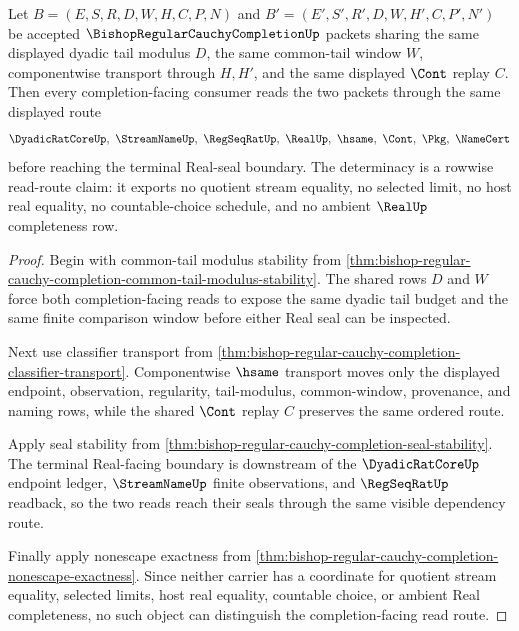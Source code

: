 \begin{theorem}
\label{thm:bishop-regular-cauchy-completion-tail-determinacy}
Let $B=(E,S,R,D,W,H,C,P,N)$ and $B'=(E',S',R',D,W,H',C,P',N')$ be accepted $\BishopRegularCauchyCompletionUp$ packets sharing the same displayed dyadic tail modulus $D$, the same common-tail window $W$, componentwise transport through $H,H'$, and the same displayed $\Cont$ replay $C$. Then every completion-facing consumer reads the two packets through the same displayed route
$$
\DyadicRatCoreUp,\ \StreamNameUp,\ \RegSeqRatUp,\ \RealUp,\ \hsame,\ \Cont,\ \Pkg,\ \NameCert
$$
before reaching the terminal Real-seal boundary. The determinacy is a rowwise read-route claim: it exports no quotient stream equality, no selected limit, no host real equality, no countable-choice schedule, and no ambient $\RealUp$ completeness row.
\end{theorem}
\begin{proof}
Begin with common-tail modulus stability from \autoref{thm:bishop-regular-cauchy-completion-common-tail-modulus-stability}. The shared rows $D$ and $W$ force both completion-facing reads to expose the same dyadic tail budget and the same finite comparison window before either Real seal can be inspected.

Next use classifier transport from \autoref{thm:bishop-regular-cauchy-completion-classifier-transport}. Componentwise $\hsame$ transport moves only the displayed endpoint, observation, regularity, tail-modulus, common-window, provenance, and naming rows, while the shared $\Cont$ replay $C$ preserves the same ordered route.

Apply seal stability from \autoref{thm:bishop-regular-cauchy-completion-seal-stability}. The terminal Real-facing boundary is downstream of the $\DyadicRatCoreUp$ endpoint ledger, $\StreamNameUp$ finite observations, and $\RegSeqRatUp$ readback, so the two reads reach their seals through the same visible dependency route.

Finally apply nonescape exactness from \autoref{thm:bishop-regular-cauchy-completion-nonescape-exactness}. Since neither carrier has a coordinate for quotient stream equality, selected limits, host real equality, countable choice, or ambient Real completeness, no such object can distinguish the completion-facing read route.
\end{proof}

